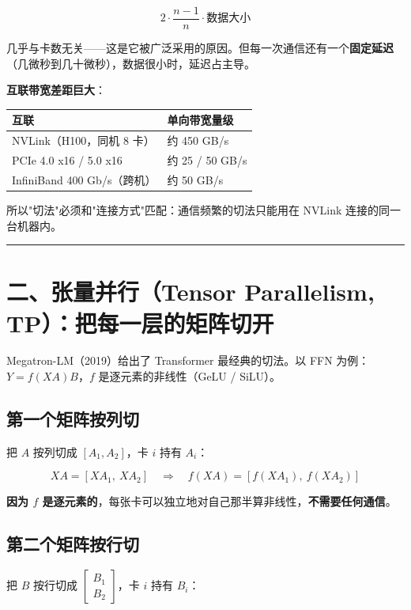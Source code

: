 \[
2 \cdot \frac{n-1}{n} \cdot \text{数据大小}
\]

几乎与卡数无关——这是它被广泛采用的原因。但每一次通信还有一个\textbf{固定延迟}（几微秒到几十微秒），数据很小时，延迟占主导。

\textbf{互联带宽差距巨大}：

\begin{center}
\small
\begin{tabularx}{\textwidth}{p{3.5cm} X}
\toprule
\textbf{互联} & \textbf{单向带宽量级} \\
\midrule
NVLink（H100，同机 8 卡） & 约 450 GB/s \\
PCIe 4.0 x16 / 5.0 x16 & 约 25 / 50 GB/s \\
InfiniBand 400 Gb/s（跨机） & 约 50 GB/s \\
\bottomrule
\end{tabularx}
\end{center}

所以"切法"必须和"连接方式"匹配：通信频繁的切法只能用在 NVLink 连接的同一台机器内。

\vspace{0.8em}\hrule\vspace{0.8em}

\section{二、张量并行（Tensor Parallelism, TP）：把每一层的矩阵切开}

Megatron-LM（2019）给出了 Transformer 最经典的切法。以 FFN 为例：$Y = f(X A) B$，$f$ 是逐元素的非线性（GeLU / SiLU）。

\subsection{第一个矩阵按列切}

把 $A$ 按列切成 $[A_1, A_2]$，卡 $i$ 持有 $A_i$：

\[
X A = [X A_1, \ X A_2] \quad \Rightarrow \quad f(XA) = [f(X A_1), \ f(X A_2)]
\]

\textbf{因为 $f$ 是逐元素的}，每张卡可以独立地对自己那半算非线性，\textbf{不需要任何通信}。

\subsection{第二个矩阵按行切}

把 $B$ 按行切成 $\begin{bmatrix} B_1 \\ B_2 \end{bmatrix}$，卡 $i$ 持有 $B_i$：

